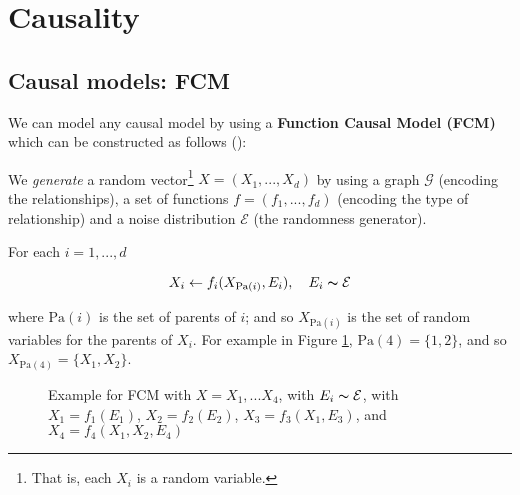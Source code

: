 \section{Causality}

\subsection{Causal models: FCM}

We can model any causal model by using a \textbf{Function Causal Model (FCM)} which can be constructed as follows
(\cite{Peters2017}):

We \textit{generate} a random vector\footnote{That is, each $X_i$ is a random variable.}
$X = (X_1, ..., X_d)$ by using a graph $\mathcal{G}$ (encoding the relationships),
a set of functions $f = (f_1, ..., f_d)$ (encoding the type of relationship) and a noise distribution $\mathcal{E}$
(the randomness generator).

For each $i = 1, ..., d$

$$
    X_i \leftarrow f_i(X_{\text{Pa}(i)}, E_i), \quad E_i \thicksim \mathcal{E}
$$

where $\text{Pa}(i)$ is the set of parents of $i$; and so $X_{\text{Pa}(i)}$ is the set of random variables
for the parents of $X_i$. For example in Figure \ref{fig:fcm_1}, $\text{Pa}(4) = \{1, 2\}$, 
and so $X_{\text{Pa}(4)} = \{X_1, X_2\}$.

\begin{figure}[!h]
    \centering

    \caption{ Example for FCM with $X = X_1, ... X_4$, with $E_i \thicksim \mathcal{E}$, 
    with $X_1 = f_1(E_1)$, $X_2 = f_2(E_2)$, $X_3 = f_3(X_1, E_3)$, and 
    $X_4 = f_4(X_1, X_2, E_4)$}
    \label{fig:fcm_1}

\end{figure}



